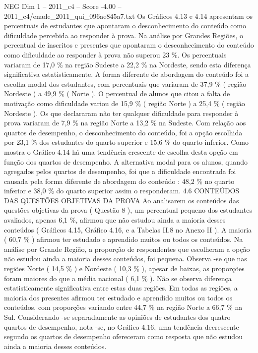 \begin{textsample}{NEG Dim 1 – 2011\_c4 – Score -4.00 – 2011\_c4/enade\_2011\_qui\_096ae845a7.txt}
Os Gráficos 4.13 e 4.14 apresentam os percentuais de estudantes que apontaram o desconhecimento do conteúdo como dificuldade percebida ao responder à prova.
Na análise por Grandes Regiões, o percentual de inscritos e presentes que apontaram o desconhecimento do conteúdo como dificuldade ao responder à prova não superou 23 \%.
Os percentuais variaram de 17,0 \% na região Sudeste a 22,2 \% na Nordeste, sendo esta diferença significativa estatisticamente.
A forma diferente de abordagem do conteúdo foi a escolha modal dos estudantes, com percentuais que variaram de 37,9 \% ( região Nordeste ) a 49,9 \% ( Norte ).
O percentual de alunos que citou a falta de motivação como dificuldade variou de 15,9 \% ( região Norte ) a 25,4 \% ( região Nordeste ).
Os que declararam não ter qualquer dificuldade para responder à prova variaram de 7,9 \% na região Norte a 13,2 \% na Sudeste.
Com relação aos quartos de desempenho, o desconhecimento do conteúdo, foi a opção escolhida por 23,1 \% dos estudantes do quarto superior e 15,6 \% do quarto inferior.
Como mostra o Gráfico 4.14 há uma tendência crescente de escolha desta opção em função dos quartos de desempenho.
A alternativa modal para os alunos, quando agregados pelos quartos de desempenho, foi que a dificuldade encontrada foi causada pela forma diferente de abordagem do conteúdo : 48,2 \% no quarto inferior e 38,0 \% do quarto superior assim o responderam. 4.6 CONTEÚDOS DAS QUESTÕES OBJETIVAS DA PROVA Ao analisarem os conteúdos das questões objetivas da prova ( Questão 8 ), um percentual pequeno dos estudantes avaliados, apenas 6,1 \%, afirmou que não estudou ainda a maioria desses conteúdos ( Gráficos 4.15, Gráfico 4.16, e a Tabelas II.8 no Anexo II ).
A maioria ( 60,7 \% ) afirmou ter estudado e aprendido muitos ou todos os conteúdos.
Na análise por Grande Região, a proporção de respondentes que escolheram a opção não estudou ainda a maioria desses conteúdos, foi pequena.
Observa -se que nas regiões Norte ( 14,5 \% ) e Nordeste ( 10,3 \% ), apesar de baixas, as proporções foram maiores do que a média nacional ( 6,1 \% ).
Não se observa diferença estatisticamente significativa entre estas duas regiões.
Em todas as regiões, a maioria dos presentes afirmou ter estudado e aprendido muitos ou todos os conteúdos, com proporções variando entre 44,7 \% na região Norte a 66,7 \% na Sul.
Considerando -se separadamente as opiniões de estudantes dos quatro quartos de desempenho, nota -se, no Gráfico 4.16, uma tendência decrescente segundo os quartos de desempenho ofereceram como resposta que não estudou ainda a maioria desses conteúdos.

\end{textsample}
